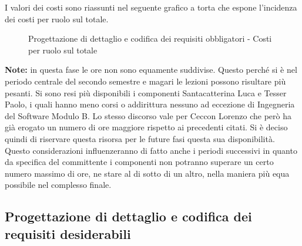 			\noindent
			I valori dei costi sono riassunti nel seguente grafico a torta che espone l’incidenza dei costi per ruolo sul totale.
			\begin{center}
				\begin{figure}[htbp]
				\vspace{0.8cm}
				\caption{Progettazione di dettaglio e codifica dei requisiti obbligatori - Costi per ruolo sul totale}
				\end{figure}
			\end{center}
		\noindent
		\textbf{Note:} in questa fase le ore non sono equamente suddivise. Questo perché si è nel periodo centrale del secondo semestre e magari le lezioni possono risultare più pesanti. Si sono resi più disponibili i componenti Santacatterina Luca e Tesser Paolo, i quali hanno meno corsi o addirittura nessuno ad eccezione di Ingegneria del Software Modulo B. Lo stesso discorso vale per Ceccon Lorenzo che però ha già erogato un numero di ore maggiore rispetto ai precedenti citati. Si è deciso quindi di riservare questa risorsa per le future fasi questa sua disponibilità. \\
		Questo considerazioni influenzeranno di fatto anche i periodi successivi in quanto da specifica del committente i componenti non potranno superare un certo numero massimo di ore, ne stare al di sotto di un altro, nella maniera più equa possibile nel complesso finale.
	
	\newpage
	\subsection{Progettazione di dettaglio e codifica dei requisiti desiderabili} %
	\label{sub:progettazione_di_dettaglio_e_codifica_dei_requisiti_desiderabili}
